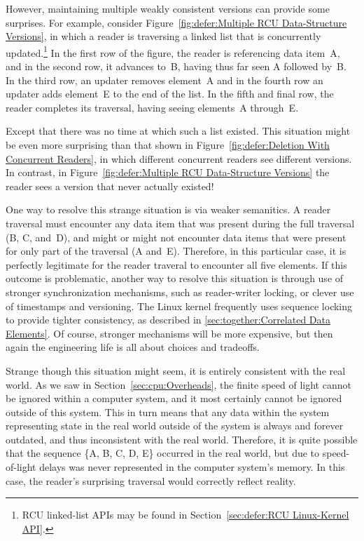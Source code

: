 However, maintaining multiple weakly consistent versions can provide
some surprises.
For example, consider
Figure~\ref{fig:defer:Multiple RCU Data-Structure Versions},
in which a reader is traversing a linked list that is concurrently
updated.\footnote{
	RCU linked-list APIs may be found in
	Section~\ref{sec:defer:RCU Linux-Kernel API}.}
In the first row of the figure, the reader is referencing data item~A,
and in the second row, it advances to~B, having thus far seen A followed by~B\@.
In the third row, an updater removes element~A and in the fourth row
an updater adds element~E to the end of the list.
In the fifth and final row, the reader completes its traversal, having
seeing elements~A through~E\@.

Except that there was no time at which such a list existed.
This situation might be even more surprising than that shown in
Figure~\ref{fig:defer:Deletion With Concurrent Readers},
in which different concurrent readers see different versions.
In contrast, in
Figure~\ref{fig:defer:Multiple RCU Data-Structure Versions}
the reader sees a version that never actually existed!

One way to resolve this strange situation is via weaker semanitics.
A reader traversal must encounter any data item that was present
during the full traversal (B, C, and~D), and might or might not
encounter data items that were present for only part of the
traversal (A and~E).
Therefore, in this particular case, it is perfectly legitimate for
the reader traveral to encounter all five elements.
If this outcome is problematic, another way to resolve this situation is
through use of stronger synchronization mechanisms, such as reader-writer
locking, or clever use of timestamps and versioning.
The Linux kernel frequently uses sequence locking to provide tighter
consistency, as described in \cref{sec:together:Correlated Data Elements}.
Of course, stronger mechanisms will be more expensive, but then again
the engineering life is all about choices and tradeoffs.

Strange though this situation might seem, it is entirely consistent with
the real world.
As we saw in
Section~\ref{sec:cpu:Overheads},
the finite speed of light cannot be ignored within a computer system,
and it most certainly cannot be ignored outside of this system.
This in turn means that any data within the system representing state
in the real world outside of the system is always and forever outdated,
and thus inconsistent with the real world.
Therefore, it is quite possible that the sequence \{A, B, C, D, E\}
occurred in the real world, but due to speed-of-light delays was
never represented in the computer system's memory.
In this case, the reader's surprising traversal would correctly reflect
reality.

